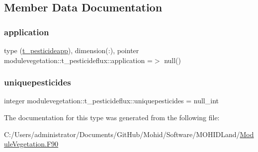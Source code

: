 \subsection{Member Data Documentation}
\mbox{\label{structmodulevegetation_1_1t__pesticideflux_a91a7dbc8184531a18b61ced180c6df6a}} 
\subsubsection{\texorpdfstring{application}{application}}
{\footnotesize\ttfamily type (\mbox{\hyperlink{structmodulevegetation_1_1t__pesticideapp}{t\+\_\+pesticideapp}}), dimension(\+:), pointer modulevegetation\+::t\+\_\+pesticideflux\+::application =$>$ null()\hspace{0.3cm}{\ttfamily [private]}}

\mbox{\label{structmodulevegetation_1_1t__pesticideflux_a5f4c8778d0eb4fd13f1004b690e351d9}} 
\subsubsection{\texorpdfstring{uniquepesticides}{uniquepesticides}}
{\footnotesize\ttfamily integer modulevegetation\+::t\+\_\+pesticideflux\+::uniquepesticides = null\+\_\+int\hspace{0.3cm}{\ttfamily [private]}}



The documentation for this type was generated from the following file\+:\begin{DoxyCompactItemize}
\item 
C\+:/\+Users/administrator/\+Documents/\+Git\+Hub/\+Mohid/\+Software/\+M\+O\+H\+I\+D\+Land/\mbox{\hyperlink{_module_vegetation_8_f90}{Module\+Vegetation.\+F90}}\end{DoxyCompactItemize}

